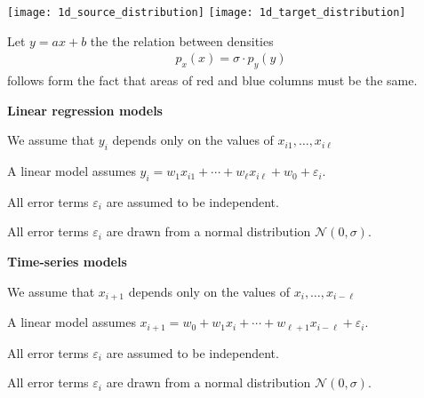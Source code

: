 \documentclass[landscape,footrule]{foils}
\begin{document}

\centerline{
\texttt{[image: 1d\_source\_distribution]}\hspace*{1cm}
\texttt{[image: 1d\_target\_distribution]}}

Let $y=ax + b$ the the relation between densities 
\begin{align*}
p_x(x)=\sigma\cdot p_y(y)
\end{align*}
follows form the fact that areas of red and blue columns must be the same.





\textbf{Linear regression models}
\begin{triangles}
\item We assume that $y_i$ depends only on the values of $x_{i1}, \ldots, x_{i\ell}$ 
\item A linear model assumes $y_{i}=w_{1}x_{i1}+\cdots+ w_\ell x_{i\ell}+ w_{0}+\varepsilon_i$.
\item All error terms $\varepsilon_i$ are assumed to be independent.
\item  All error terms $\varepsilon_i$ are drawn from a normal distribution $\mathcal{N}(0,\sigma)$.
\end{triangles}





\textbf{Time-series models}
\begin{triangles}
\item We assume that $x_{i+1}$ depends only on the values of $x_i, \ldots, x_{i-\ell}$ 
\item A linear model assumes $x_{i+1}=w_0+w_{1}x_i+\cdots+ w_{\ell+1} x_{i-\ell}+\varepsilon_i$.
\item All error terms $\varepsilon_i$ are assumed to be independent.
\item  All error terms $\varepsilon_i$ are drawn from a normal distribution $\mathcal{N}(0,\sigma)$.
\end{triangles}
\end{document}
